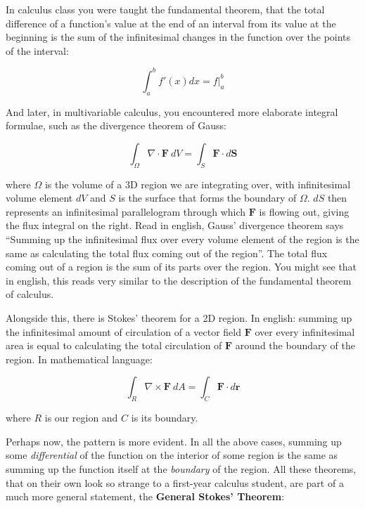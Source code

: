 \documentclass[../master.tex]{subfiles}
\begin{document}
In calculus class you were taught the fundamental theorem, that the total difference of a function's value at the end of an interval from its value at the beginning is the sum of the infinitesimal changes in the function over the points of the interval:

	\begin{equation}\label{eq:FTOC}
		\int_a^b f'(x) dx = f\rvert^b_a
	\end{equation}

And later, in multivariable calculus, you encountered more elaborate integral formulae, such as the divergence theorem of Gauss:

	\begin{equation}\label{eq:Divergence}
		\int_\Omega \nabla \cdot \mathbf{F} ~ dV = \int_S \mathbf{F} \cdot d\mathbf S
	\end{equation}

	where $\Omega$ is the volume of a 3D region we are integrating over, with infinitesimal volume element $dV$ and $S$ is the surface that forms the boundary of $\Omega$. $dS$ then represents an infinitesimal parallelogram through which $\mathbf{F}$ is flowing out, giving the flux integral on the right. Read in english, Gauss' divergence theorem says ``Summing up the infinitesimal flux over every volume element of the region is the same as calculating the total flux coming out of the region''. The total flux coming out of a region is the sum of its parts over the region. You might see that in english, this reads very similar to the description of the fundamental theorem of calculus.
	
	Alongside this, there is Stokes' theorem for a 2D region. In english: summing up the infinitesimal amount of circulation of a vector field $\mathbf F$ over every infinitesimal area is equal to calculating the total circulation of $\mathbf F$ around the boundary of the region. In mathematical language:
	
	\begin{equation}\label{eq:Stokes}
		\int_R \nabla \times \mathbf{F} ~ dA = \int_C \mathbf{F} \cdot d\mathbf r
	\end{equation}
	
	where $R$ is our region and $C$ is its boundary.
	
	Perhaps now, the pattern is more evident. In all the above cases, summing up some \emph{differential} of the function on the interior of some region is the same as summing up the function itself at the \emph{boundary} of the region. All these theorems, that on their own look so strange to a first-year calculus student, are part of a much more general statement, the \textbf{General Stokes' Theorem}:
	
\end{document}
